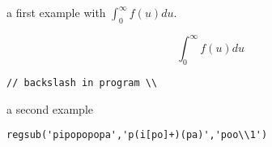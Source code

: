 \begin{examples}

a first example with $\int_0^\infty f(u)du$.

\[
\int_0^\infty f(u)du
\]

\begin{program}
  \verb+// backslash in program \\+
  
\end{program}

\noindent a second example 

\begin{program}
\end{program}

\begin{program}
  \verb!regsub('pipopopopa','p(i[po]+)(pa)','poo\\1')! 
\end{program}

\end{examples}

\begin{manseealso}
\end{manseealso}

